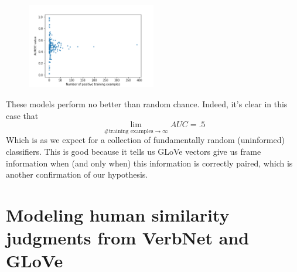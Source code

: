 \documentclass[a4paper]{article}
\begin{document}
\begin{figure}[H]
	\centering
	\includegraphics[width=0.5\textwidth]{auc_scatter5rand.png}
	\caption{\label{fig:frog} }
\end{figure}

These models perform no better than random chance. Indeed, it's clear in this case that 
\[  \lim_{\# \text{training examples} \rightarrow \infty} AUC = .5 \]
Which is as we expect for a collection of fundamentally random (uninformed) classifiers. This is good because it tells us GLoVe vectors give us frame information when (and only when) this information is correctly paired, which is another confirmation of our hypothesis.

\section{Modeling human similarity judgments from VerbNet and GLoVe}
\end{document}
